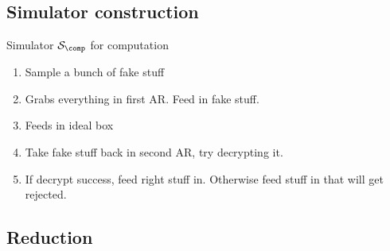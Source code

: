 \subsection{Simulator construction}

\begin{protocol}{Simulator $\cS_\comp$ for computation}

	\begin{enumerate}
		\item Sample a bunch of fake stuff
		\item Grabs everything in first AR. Feed in fake stuff.
		\item Feeds in ideal box
		\item Take fake stuff back in second AR, try decrypting it.
		\item If decrypt success, feed right stuff in. Otherwise feed stuff in that will get rejected.
	\end{enumerate}

\end{protocol}

\subsection{Reduction}

